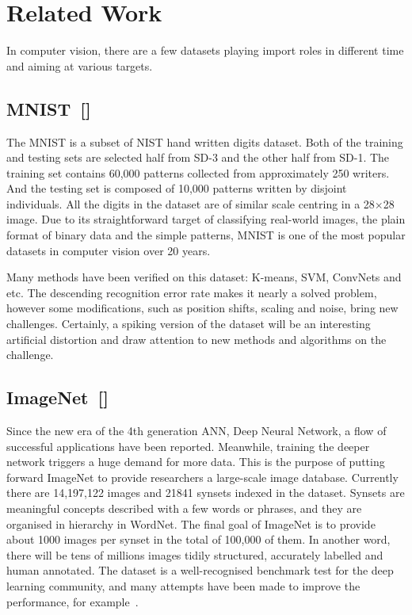 \section{Related Work}
\label{sec:Related}
In computer vision, there are a few datasets playing import roles in different time and aiming at various targets.
\subsection{MNIST~[\cite{lecun_gradient-based_1998}]}
The MNIST is a subset of NIST hand written digits dataset. 
Both of the training and testing sets are selected half from SD-3 and the other half from SD-1. 
The training set contains 60,000 patterns collected from approximately 250 writers.
And the testing set is composed of 10,000 patterns written by disjoint individuals.
All the digits in the dataset are of similar scale centring in a 28$ \times $28 image.
Due to its straightforward target of classifying real-world images, the plain format of binary data and 
the simple patterns, MNIST is one of the most popular datasets in computer vision over 20 years.

Many methods have been verified on this dataset: K-means, SVM, ConvNets and etc.
The descending recognition error rate makes it nearly a solved problem, however some modifications, such as position shifts, scaling and noise, bring new challenges.
Certainly, a spiking version of the dataset will be an interesting artificial distortion and draw attention to new methods and algorithms on the challenge. 

\subsection{ImageNet~[\cite{deng_imagenet:_2009}]}
Since the new era of the 4th generation ANN, Deep Neural Network, a flow of successful applications have been reported.
Meanwhile, training the deeper network triggers a huge demand for more data.
This is the purpose of putting forward ImageNet to provide researchers a large-scale image database.
Currently there are 14,197,122 images and 21841 synsets indexed in the dataset.
Synsets are meaningful concepts described with a few words or phrases, and they are organised in hierarchy in WordNet.
The final goal of ImageNet is to provide about 1000 images per synset in the total of 100,000 of them.
In another word, there will be tens of millions images tidily structured, accurately labelled and human annotated.
The dataset is a well-recognised benchmark test for the deep learning community, and many attempts have been made to improve the performance, for example~\cite{krizhevsky2012imagenet}.

